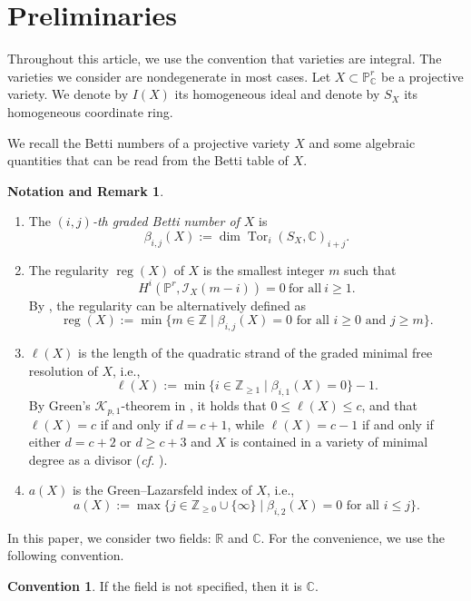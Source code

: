 \documentclass[11pt,letterpaper,reqno]{amsart}
\theoremstyle{plain}
\theoremstyle{definition}
\newtheorem{convention}[theorem]{Convention}
\newtheorem{open problem}[theorem]{Open Problem}
\newtheorem{remark and notation}[theorem]{Remark and Notation}
\newtheorem{remark and definition}[theorem]{Remark and Definition}
\newtheorem{definition and notation}[theorem]{Definition and Notation}
\newtheorem{notation and convention}[theorem]{Notation and Convention}
\newtheorem{notation and remark}[theorem]{Notation and Remark}
\newtheorem{convention and notation}[theorem]{Convention and Notation}
\def \p {\mathbb{P}}
\def \z {\mathbb{Z}}
\def \r {\mathbb{R}}
\def \c {\mathbb{C}}
\def \tor {\operatorname{Tor}}
\def \reg {\operatorname{reg}}
\begin{document}
\bigskip

\section{Preliminaries}\label{sec:Prelim}
Throughout this article, we use the convention that varieties are integral. 
The varieties we consider are nondegenerate in most cases.
Let $X\subset\p^r_\c$ be a projective variety.
We denote by $I(X)$ its homogeneous ideal and denote by $S_X$ its homogeneous coordinate ring.

We recall the Betti numbers of a projective variety $X$ and some algebraic quantities that can be read from the Betti table of $X$.
\begin{notation and remark}\label{betti_remark}
\phantom{}
\begin{enumerate}[\rm (1)]
    \item The \textit{$(i,j)$-th graded Betti number of $X$} is $$\beta_{i,j}(X):=\dim\tor_i(S_X,\c)_{i+j}.$$
    \item The regularity $\reg(X)$ of $X$ is the smallest integer $m$ such that
    $$H^i(\p^{r},\mathcal{I}_X(m-i))=0 ~\text{for all}~ i\geq 1.$$
    By \cite{MR741934}, the regularity can be alternatively defined as
    $$\reg(X):=\min\{m\in \z\mid \beta_{i,j}(X)=0\text{ for all }i\geq 0\text{ and }j\geq m\}.$$
    \item\label{ell_def}  $\ell(X)$ is the length of the quadratic strand of the graded minimal free resolution of $X$, i.e.,
    $$\ell(X) := \min\{i\in\z_{\geq 1}\mid \beta_{i,1}(X)=0\}-1.$$
    By Green's $\mathcal{K}_{p,1}$-theorem in \cite{MR739785}, it holds that $0\leq \ell(X)\leq c$, and that $\ell(X)=c$ if and only if $d=c+1$, while $\ell(X)=c-1$ if and only if either $d=c+2$ or $d\geq c+3$ and $X$ is contained in a variety of minimal degree as a divisor (\textit{cf.} \cite[Theorem 1.1]{MR4816776}).
    \item  $a(X)$ is the Green--Lazarsfeld index of $X$, i.e.,
    $$a(X) := \max\{j\in\z_{\geq 0}\cup \{\infty\}\mid \beta_{i,2}(X)=0\text{ for all $i\leq j$} \}.$$ 
\end{enumerate}
\end{notation and remark}

In this paper, we consider two fields: $\r$ and $\c$. For the convenience, we use the following convention.

\begin{convention}
    If the field is not specified, then it is $\c$.
\end{convention}
\end{document}
